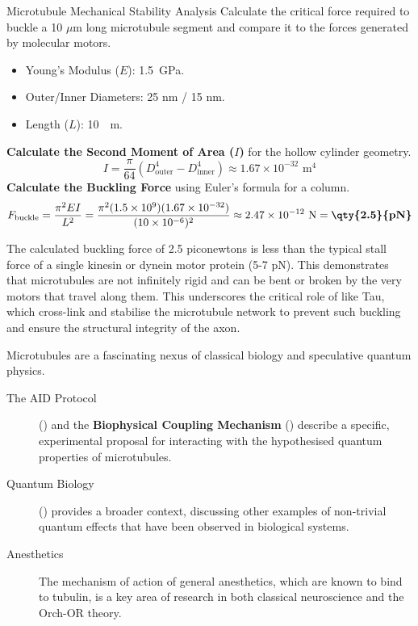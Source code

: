 \begin{workedexample}{Microtubule Mechanical Stability Analysis}
     Calculate the critical force required to buckle a 10 $\mu$m long microtubule segment and compare it to the forces generated by molecular motors.
    \begin{itemize}
        \item Young's Modulus ($E$): \qty{1.5}{GPa}.
        \item Outer/Inner Diameters: 25 nm / 15 nm.
        \item Length ($L$): \qty{10}{\mu m}.
    \end{itemize}
    \begin{derivationsteps}
        \step \textbf{Calculate the Second Moment of Area ($I$)} for the hollow cylinder geometry.
        \[ I = \frac{\pi}{64}(D_{\text{outer}}^4 - D_{\text{inner}}^4) \approx 1.67 \times 10^{-32} \text{ m}^4 \]
        \step \textbf{Calculate the Buckling Force} using Euler's formula for a column.
        \[ F_{\text{buckle}} = \frac{\pi^2 EI}{L^2} = \frac{\pi^2 (1.5 \times 10^9)(1.67 \times 10^{-32})}{(10 \times 10^{-6})^2} \approx 2.47 \times 10^{-12} \text{ N} = \textbf{\qty{2.5}{pN}} \]
    \end{derivationsteps}
     The calculated buckling force of 2.5 piconewtons is less than the typical stall force of a single kinesin or dynein motor protein (5-7 pN). This demonstrates that microtubules are not infinitely rigid and can be bent or broken by the very motors that travel along them. This underscores the critical role of  like Tau, which cross-link and stabilise the microtubule network to prevent such buckling and ensure the structural integrity of the axon.
\end{workedexample}


\begin{importantbox}[title={Further Reading}]
    Microtubules are a fascinating nexus of classical biology and speculative quantum physics.
    \begin{description}
        \item[The AID Protocol] () and the \textbf{Biophysical Coupling Mechanism} () describe a specific, experimental proposal for interacting with the hypothesised quantum properties of microtubules.
        \item[Quantum Biology] () provides a broader context, discussing other examples of non-trivial quantum effects that have been observed in biological systems.
        \item[Anesthetics] The mechanism of action of general anesthetics, which are known to bind to tubulin, is a key area of research in both classical neuroscience and the Orch-OR theory.
    \end{description}
\end{importantbox}